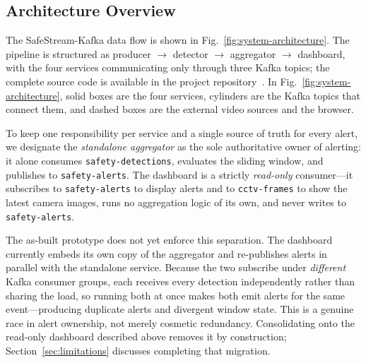 \documentclass[conference]{IEEEtran}
\begin{document}
\subsection{Architecture Overview}
\label{subsec:architecture}

The SafeStream-Kafka data flow is shown in
Fig.~\ref{fig:system-architecture}. The pipeline is structured as producer
$\rightarrow$ detector $\rightarrow$ aggregator $\rightarrow$ dashboard, with
the four services communicating only through three Kafka topics; the complete
source code is available in the project repository~\cite{b14}. In
Fig.~\ref{fig:system-architecture}, solid boxes are the four services, cylinders
are the Kafka topics that connect them, and dashed boxes are the external video
sources and the browser.

To keep one responsibility per service and a single source of truth for every
alert, we designate the \emph{standalone aggregator} as the sole authoritative
owner of alerting: it alone consumes \texttt{safety-detections}, evaluates the
sliding window, and publishes to \texttt{safety-alerts}. The dashboard is a
strictly \emph{read-only} consumer---it subscribes to \texttt{safety-alerts} to
display alerts and to \texttt{cctv-frames} to show the latest camera images, runs
no aggregation logic of its own, and never writes to \texttt{safety-alerts}.

The as-built prototype does not yet enforce this separation. The dashboard
currently embeds its own copy of the aggregator and re-publishes alerts in
parallel with the standalone service. Because the two subscribe under
\emph{different} Kafka consumer groups, each receives every detection
independently rather than sharing the load, so running both at once makes both
emit alerts for the same event---producing duplicate alerts and divergent
window state. This is a genuine race in alert ownership, not merely cosmetic
redundancy. Consolidating onto the read-only dashboard described above removes
it by construction; Section~\ref{sec:limitations} discusses completing that
migration.
\end{document}
